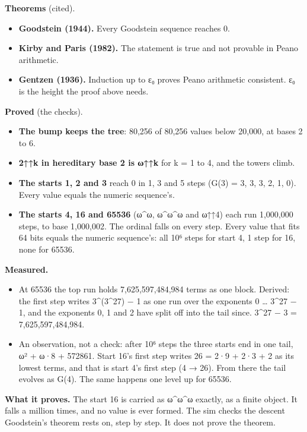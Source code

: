 \textbf{Theorems} (cited).

\begin{itemize}
\item \textbf{Goodstein (1944).} Every Goodstein sequence reaches 0.
\item \textbf{Kirby and Paris (1982).} The statement is true and not provable in Peano arithmetic.
\item \textbf{Gentzen (1936).} Induction up to ε₀ proves Peano arithmetic consistent. ε₀ is the height the proof above needs.
\end{itemize}

\textbf{Proved} (the checks).

\begin{itemize}
\item \textbf{The bump keeps the tree}: 80,256 of 80,256 values below 20,000, at bases 2 to 6.
\item \textbf{2↑↑k in hereditary base 2 is ω↑↑k} for k = 1 to 4, and the towers climb.
\item \textbf{The starts 1, 2 and 3} reach 0 in 1, 3 and 5 steps (G(3) = 3, 3, 3, 2, 1, 0). Every value equals the numeric sequence's.
\item \textbf{The starts 4, 16 and 65536} (ω\textasciicircum{}ω, ω\textasciicircum{}ω\textasciicircum{}ω and ω↑↑4) each run 1,000,000 steps, to base 1,000,002. The ordinal falls on every step. Every value that fits 64 bits equals the numeric sequence's: all 10⁶ steps for start 4, 1 step for 16, none for 65536.
\end{itemize}

\textbf{Measured.}

\begin{itemize}
\item At 65536 the top run holds 7,625,597,484,984 terms as one block. Derived: the first step writes 3\textasciicircum{}(3\textasciicircum{}27) − 1 as one run over the exponents 0 … 3\textasciicircum{}27 − 1, and the exponents 0, 1 and 2 have split off into the tail since. 3\textasciicircum{}27 − 3 = 7,625,597,484,984.
\item An observation, not a check: after 10⁶ steps the three starts end in one tail, ω² + ω·8 + 572861. Start 16's first step writes 26 = 2·9 + 2·3 + 2 as its lowest terms, and that is start 4's first step (4 → 26). From there the tail evolves as G(4). The same happens one level up for 65536.
\end{itemize}

\textbf{What it proves.} The start 16 is carried as ω\textasciicircum{}ω\textasciicircum{}ω exactly, as a finite object. It falls a million times, and no value is ever formed. The sim checks the descent Goodstein's theorem rests on, step by step. It does not prove the theorem.

